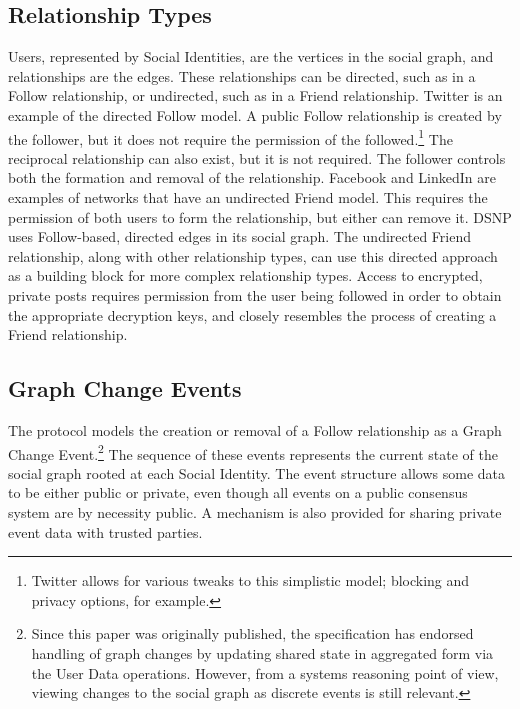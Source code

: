 \documentclass[12pt,letterpaper]{article}
\begin{document}
\subsection{Relationship Types}\label{sec:relationship_types}

Users, represented by Social Identities, are the vertices in the social graph, and
relationships are the edges. These relationships can be directed, such as in a Follow
relationship, or undirected, such as in a Friend relationship. Twitter is an
example of the directed Follow model. A public Follow relationship is created by the
follower, but it does not require the permission of the followed.\footnote{Twitter allows for
  various tweaks to this simplistic model; blocking and privacy options, for example.} The
reciprocal relationship can also exist, but it is not required. The follower controls both
the formation and removal of the relationship. Facebook and LinkedIn are examples of
networks that have an undirected Friend model. This requires the permission of both users to
form the relationship, but either can remove it. DSNP uses Follow-based, directed edges in
its social graph. The undirected Friend relationship, along with other relationship types,
can use this directed approach as a building block for more complex relationship
types. Access to encrypted, private posts requires permission from the user being followed
in order to obtain the appropriate decryption keys, and closely resembles the process of
creating a Friend relationship.

\subsection{Graph Change Events}\label{sec:graph_change_events}

The protocol models the creation or removal of a Follow relationship as a Graph Change
Event.\footnote{Since this paper was originally published, the specification has endorsed
  handling of graph changes by updating shared state in aggregated form via the User Data
  operations. However, from a systems reasoning point of view, viewing changes to the social
  graph as discrete events is still relevant.} The sequence of these events represents the
current state of the social graph rooted at each Social Identity. The event structure allows
some data to be either public or private, even though all events on a public consensus
system are by necessity public. A mechanism is also provided for sharing private event data
with trusted parties.
\end{document}
